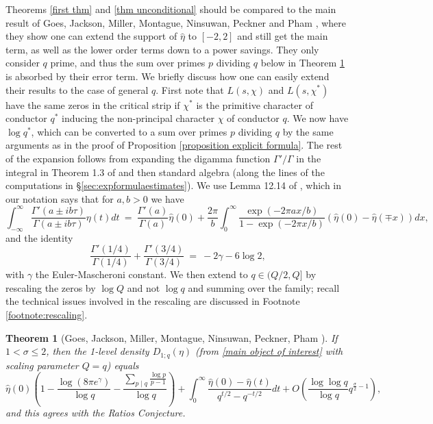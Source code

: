 \documentclass[12pt,reqno]{amsart}
\numberwithin{equation}{section}
\theoremstyle{plain}
\newtheorem{theorem}[thm]{Theorem}
\begin{document}
Theorems \ref{first thm} and \ref{thm unconditional} should be compared to the main result of Goes, Jackson, Miller, Montague, Ninsuwan, Peckner and Pham  \cite{GJMMNPP}, where they show one can extend the support of ${\widehat{\eta}}$ to $[-2,2]$ and still get the main term, as well as the lower order terms down to a power savings. They only consider $q$ prime, and thus the sum over primes $p$ dividing $q$ below in Theorem \ref{thm millergoesal}   is absorbed by their error term. We briefly discuss how one can easily extend their results to the case of general $q$. First note that $L(s,\chi)$ and $L(s,\chi^\ast)$ have the same zeros in the critical strip if $\chi^\ast$ is the primitive character of conductor $q^\ast$ inducing the non-principal character $\chi$ of conductor $q$. We now have $\log q^\ast$, which can be converted to a sum over primes $p$ dividing $q$ by the same arguments as in the proof of Proposition \ref{proposition explicit formula}. The rest of the expansion follows from expanding the digamma function $\Gamma'/\Gamma$ in the integral in Theorem 1.3 of \cite{GJMMNPP} and then standard algebra (along the lines of the computations in \S\ref{sec:expformulaestimates}). We use Lemma 12.14 of \cite{montgomery}, which in our notation says that for $a, b > 0$ we have \begin{equation} \int_{-\infty}^\infty \frac{\Gamma'(a \pm i b \tau)}{\Gamma(a \pm i b \tau)} \eta(t) dt \ = \ \frac{\Gamma'(a)}{\Gamma(a)} \widehat{\eta}(0) + \frac{2\pi}{b} \int_{0}^\infty \frac{\exp(-2\pi a x / b)}{1 - \exp(-2\pi x/b)} \left(\widehat{\eta}(0) - \widehat{\eta}(\mp x)\right)dx,\end{equation} and the identity \begin{equation} \frac{\Gamma'(1/4)}{\Gamma(1/4)} + \frac{\Gamma'(3/4)}{\Gamma(3/4)} \ = \ -2\gamma - 6 \log 2, \end{equation} with $\gamma$ the Euler-Mascheroni constant. We then extend to $q \in (Q/2, Q]$ by rescaling the zeros by $\log Q$ and not $\log q$ and summing over the family; recall the technical issues involved in the rescaling are discussed in Footnote \ref{footnote:rescaling}.

\begin{theorem}[Goes, Jackson, Miller, Montague, Ninsuwan, Peckner, Pham \cite{GJMMNPP}]
\label{thm millergoesal}
If $1<\sigma\leq 2$, then the 1-level density $D_{1;q}(\eta)$ (from \eqref{main object of interest} with scaling parameter $Q=q$) equals
\begin{equation}\label{equation support [-2,2]}{\widehat{\eta}}(0) \left(  1-\frac { \log(8\pi e^{\gamma})}{\log q}-\frac{\sum_{p\mid q}\frac{\log p}{p-1}}{\log q}\right)
+\int_0^{\infty}\frac{{\widehat{\eta}}(0)-{\widehat{\eta}}(t)}{q^{t/2}-q^{-t/2}} dt
    +O\left(\frac{\log\log q}{\log q}q^{\frac{\sigma}2-1}\right),
 \end{equation} and this agrees with the Ratios Conjecture.
\end{theorem}
\end{document}

